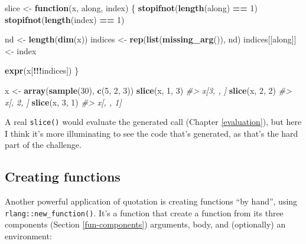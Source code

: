\documentclass[]{book}
\newenvironment{Shaded}{\begin{snugshade}}{\end{snugshade}}
\newcommand{\CommentTok}[1]{\textcolor[rgb]{0.37,0.37,0.37}{\textit{#1}}}
\newcommand{\ControlFlowTok}[1]{\textcolor[rgb]{0.27,0.27,0.27}{\textbf{#1}}}
\newcommand{\DecValTok}[1]{\textcolor[rgb]{0.06,0.06,0.06}{#1}}
\newcommand{\KeywordTok}[1]{\textcolor[rgb]{0.27,0.27,0.27}{\textbf{#1}}}
\newcommand{\NormalTok}[1]{#1}
\newcommand{\OperatorTok}[1]{\textcolor[rgb]{0.43,0.43,0.43}{\textbf{#1}}}
\newcommand{\StringTok}[1]{\textcolor[rgb]{0.5,0.5,0.5}{#1}}
\begin{document}
\begin{Shaded}
\begin{Highlighting}[]
\NormalTok{slice <-}\StringTok{ }\ControlFlowTok{function}\NormalTok{(x, along, index) \{}
  \KeywordTok{stopifnot}\NormalTok{(}\KeywordTok{length}\NormalTok{(along) }\OperatorTok{==}\StringTok{ }\DecValTok{1}\NormalTok{)}
  \KeywordTok{stopifnot}\NormalTok{(}\KeywordTok{length}\NormalTok{(index) }\OperatorTok{==}\StringTok{ }\DecValTok{1}\NormalTok{)}
    
\NormalTok{  nd <-}\StringTok{ }\KeywordTok{length}\NormalTok{(}\KeywordTok{dim}\NormalTok{(x))}
\NormalTok{  indices <-}\StringTok{ }\KeywordTok{rep}\NormalTok{(}\KeywordTok{list}\NormalTok{(}\KeywordTok{missing_arg}\NormalTok{()), nd)}
\NormalTok{  indices[[along]] <-}\StringTok{ }\NormalTok{index}
  
  \KeywordTok{expr}\NormalTok{(x[}\OperatorTok{!!!}\NormalTok{indices])}
\NormalTok{\}}

\NormalTok{x <-}\StringTok{ }\KeywordTok{array}\NormalTok{(}\KeywordTok{sample}\NormalTok{(}\DecValTok{30}\NormalTok{), }\KeywordTok{c}\NormalTok{(}\DecValTok{5}\NormalTok{, }\DecValTok{2}\NormalTok{, }\DecValTok{3}\NormalTok{))}
\KeywordTok{slice}\NormalTok{(x, }\DecValTok{1}\NormalTok{, }\DecValTok{3}\NormalTok{)}
\CommentTok{#> x[3, , ]}
\KeywordTok{slice}\NormalTok{(x, }\DecValTok{2}\NormalTok{, }\DecValTok{2}\NormalTok{)}
\CommentTok{#> x[, 2, ]}
\KeywordTok{slice}\NormalTok{(x, }\DecValTok{3}\NormalTok{, }\DecValTok{1}\NormalTok{)}
\CommentTok{#> x[, , 1]}
\end{Highlighting}
\end{Shaded}

A real \texttt{slice()} would evaluate the generated call (Chapter \ref{evaluation}), but here I think it's more illuminating to see the code that's generated, as that's the hard part of the challenge.

\hypertarget{new-function}{%
\subsection{Creating functions}\label{new-function}}


Another powerful application of quotation is creating functions ``by hand'', using \texttt{rlang::new\_function()}. It's a function that create a function from its three components (Section \ref{fun-components}) arguments, body, and (optionally) an environment:
\end{document}
